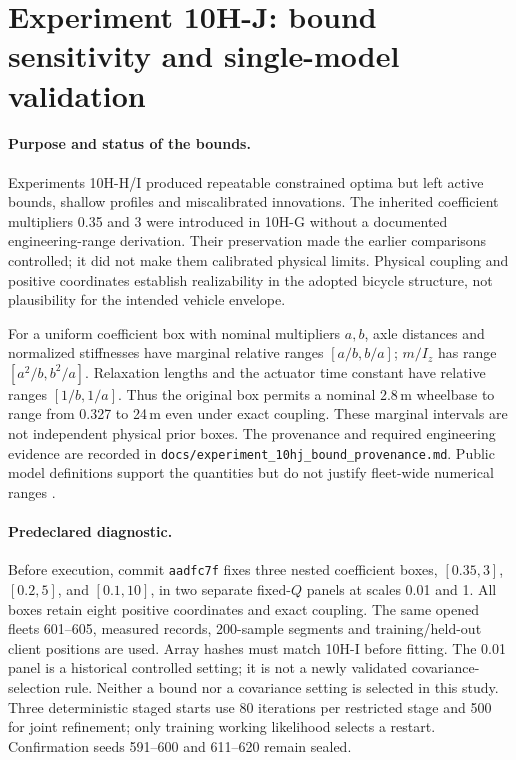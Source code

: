 \section{Experiment 10H-J: bound sensitivity and single-model validation}
\label{sec:experiment10hj}

\paragraph{Purpose and status of the bounds.}
Experiments 10H-H/I produced repeatable constrained optima but left active
bounds, shallow profiles and miscalibrated innovations. The inherited
coefficient multipliers 0.35 and 3 were introduced in 10H-G without a
documented engineering-range derivation. Their preservation made the earlier
comparisons controlled; it did not make them calibrated physical limits.
Physical coupling and positive coordinates establish realizability in the
adopted bicycle structure, not plausibility for the intended vehicle envelope.

For a uniform coefficient box with nominal multipliers $a,b$, axle distances
and normalized stiffnesses have marginal relative ranges $[a/b,b/a]$;
$m/I_z$ has range $[a^2/b,b^2/a]$. Relaxation lengths and the actuator time
constant have relative ranges $[1/b,1/a]$. Thus the original box permits a
nominal 2.8\,m wheelbase to range from 0.327 to 24\,m even under exact coupling.
These marginal intervals are not independent physical prior boxes.
The provenance and required engineering evidence are recorded in
\texttt{docs/experiment\_10hj\_bound\_provenance.md}. Public model definitions
support the quantities but do not justify fleet-wide numerical ranges
\cite{mathworksVehicleBody2026}.

\paragraph{Predeclared diagnostic.}
Before execution, commit \texttt{aadfc7f} fixes three nested coefficient boxes,
$[0.35,3]$, $[0.2,5]$, and $[0.1,10]$, in two separate fixed-$Q$ panels at
scales 0.01 and 1. All boxes retain eight positive coordinates and exact
coupling. The same opened fleets 601--605, measured records, 200-sample
segments and training/held-out client positions are used. Array hashes must
match 10H-I before fitting. The 0.01 panel is a historical controlled setting;
it is not a newly validated covariance-selection rule. Neither a bound nor a
covariance setting is selected in this study. Three deterministic staged
starts use 80 iterations per restricted stage and 500 for joint refinement;
only training working likelihood selects a restart. Confirmation seeds
591--600 and 611--620 remain sealed.

